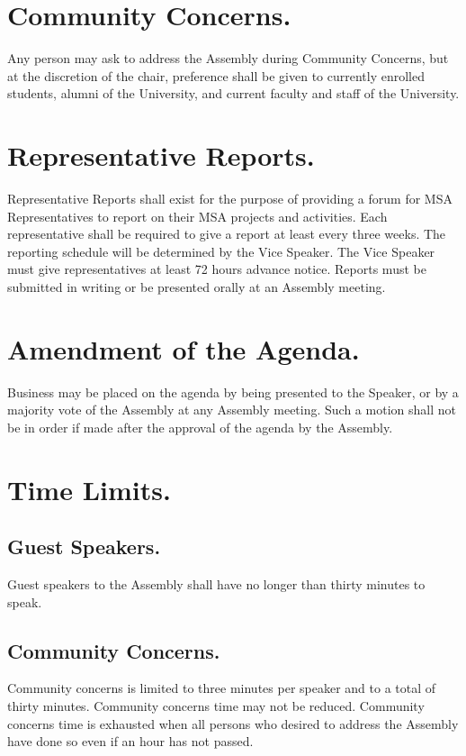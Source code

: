 \documentclass{rules}
\begin{document}
\section{Community Concerns.}
Any person may ask to address the Assembly during Community Concerns, but at the discretion of the chair, preference shall be given to currently enrolled students, alumni of the University, and current faculty and staff of the University.

\section{Representative Reports.}
Representative Reports shall exist for the purpose of providing a forum for MSA Representatives to report on their MSA projects and activities.  Each representative shall be required to give a report at least every three weeks.  The reporting schedule will be determined by the Vice Speaker.  The Vice Speaker must give representatives at least 72 hours advance notice.  Reports must be submitted in writing or be presented orally at an Assembly meeting. 

\section{Amendment of the Agenda.}
Business may be placed on the agenda by being presented to the Speaker, or by a majority vote of the Assembly at any Assembly meeting.  Such a motion shall not be in order if made after the approval of the agenda by the Assembly.

\section{Time Limits.}
\subsection{Guest Speakers.}
Guest speakers to the Assembly shall have no longer than thirty minutes to speak.
\subsection{Community Concerns.}
Community concerns is limited to three minutes per speaker and to a total of thirty minutes. Community concerns time may not be reduced.  Community concerns time is exhausted when all persons who desired to address the Assembly have done so even if an hour has not passed.
\end{document}
